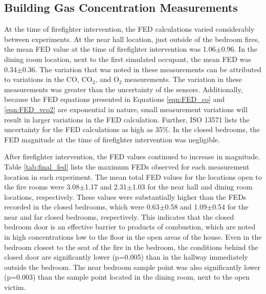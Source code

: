 \documentclass[12pt,oneside]{article}
\begin{document}
\subsection{Building Gas Concentration Measurements}
\label{subsec:gas}
At the time of firefighter intervention, the FED calculations varied considerably between experiments. At the near hall location, just outside of the bedroom fires,  the mean FED value at the time of firefighter intervention was 1.06$\pm$0.96. In the dining room location, next to the first simulated occupant, the mean FED was 0.34$\pm$0.36. The variation that was noted in these measurements can be attributed to variations in the CO, CO$_2$, and O$_2$ measurements. The variation in these measurements was greater than the uncertainty of the sensors. Additionally, because the FED equations presented in Equations \ref{eqn:FED_co} and \ref{eqn:FED_vco2} are exponential in nature, small measurement variations will result in larger variations in the FED calculation. Further, ISO 13571 \cite{ISO13571} lists the uncertainty for the FED calculations as high as 35\%. In the closed bedrooms, the FED magnitude at the time of firefighter intervention was negligible. 

After firefighter intervention, the FED values continued to increase in magnitude. Table \ref{tab:final_fed} lists the maximum FEDs observed for each measurement location in each experiment. The mean total FED values for the  locations open to the fire rooms were 3.08$\pm$1.17 and 2.31$\pm$1.03 for the near hall and dining room locations, respectively. These values were substantially higher than the FEDs recorded in the closed bedrooms, which were 0.63$\pm$0.58 and 1.09$\pm$0.54 for the near and far closed bedrooms, respectively. This indicates that the closed bedroom door is an effective barrier to products of combustion, which are noted in high concentrations low to the floor in the open areas of the house. Even in the bedroom closest to the seat of the fire in the bedroom, the conditions behind the closed door are significantly lower (p=0.005) than in the hallway immediately outside the bedroom. The near bedroom sample point was also significantly lower (p=0.003) than the sample point located in the dining room, next to the open victim.
\end{document}

